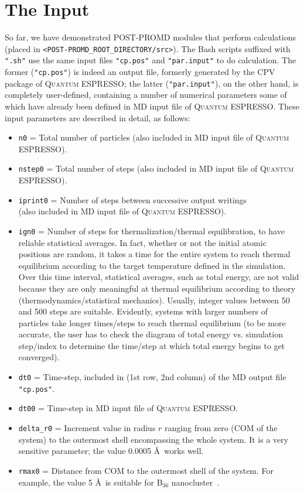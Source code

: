 \documentclass[11pt]{article}
\def\qe{\textsc{Quantum ESPRESSO}}
\begin{document}
\section{\label{sec:inps}The Input}
\begin{sloppypar}
So far, we have demonstrated POST-PROMD modules that perform calculations (placed in {\texttt{<POST-PROMD\_ROOT\_DIRECTORY/src>}}). The Bash scripts suffixed with {\texttt{".sh"}} use the same input files {\texttt{"cp.pos"}} and {\texttt{"par.input"}} to do calculation. The former ({\texttt{"cp.pos"}}) is indeed an output file, formerly generated by the CPV package of \qe; the latter ({\texttt{"par.input"}}), on the other hand, is completely user-defined, containing a number of numerical parameters some of which have already been defined in MD input file of \qe. These input parameters are described in detail, as follows:
\end{sloppypar}
\begin{itemize}
\item {\texttt{n0}} = Total number of particles (also included in MD input file of \qe).
\item {\texttt{nstep0}} = Total number of steps (also included in MD input file of \qe).
\item {\texttt{iprint0}} = Number of steps between successive output writings 
\\(also included in MD input file of \qe).
\item {\texttt{ign0}} = Number of steps for thermalization/thermal equilibration, to have reliable statistical averages. In fact, whether or not the initial atomic positions are random, it takes a time for the entire system to reach thermal equilibrium according to the target temperature defined in the simulation. Over this time interval, statistical averages, such as total energy, are not valid because they are only meaningful at thermal equilibrium according to theory (thermodynamics/statistical mechanics). Usually, integer values between 50 and 500 steps are suitable. Evidently, systems with larger numbers of particles take longer times/steps to reach thermal equilibrium (to be more accurate, the user has to check the diagram of total energy vs. simulation step/index to determine the time/step at which total energy begins to get converged).
\item {\texttt{dt0}} = Time-step, included in (1st row, 2nd column) of the MD output file {\texttt{"cp.pos"}}.
\item {\texttt{dt00}} = Time-step in MD input file of \qe.
\item {\texttt{delta\_r0}} = Increment value in radius $r$ ranging from zero (COM of the system) to the outermost shell encompassing the whole system. It is a very sensitive parameter; the value 0.0005 \AA\ works well.
\item {\texttt{rmax0}} = Distance from COM to the outermost shell of the system. For example, the value 5 \AA\ is suitable for B$_{36}$ nanocluster~\cite{b36}.
\end{itemize}
\end{document}
